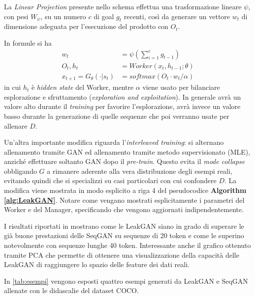 La \emph{Linear Projection} presente nello schema effettua una trasformazione lineare $\psi$, con pesi $W_\psi$, su un numero $c$ di goal $g_t$ recenti, così da generare un vettore $w_t$ di dimensione adeguata per l'esecuzione del prodotto con $O_t$.

\noindent
In formule si ha
\begin{align}
  w_t &= \psi \left( \sum_{i=1}^{c} g_{t-1} \right)
  \\
  O_t, h_t &= Worker(x_t, h_{t-1}; \theta)
  \\
  x_{t+1} = G_\theta(\cdot|s_t) &= softmax ( O_t \cdot w_t / \alpha)
\end{align}
in cui $h_t$ è \emph{hidden state} del Worker, mentre $\alpha$ viene usato per bilanciare esplorazione e sfruttamento (\emph{exploration and exploitation}).
In generale avrà un valore alto durante il \emph{training} per favorire l'esplorazione, avrà invece un valore basso durante la generazione di quelle sequenze che poi verranno usate per allenare $D$.


Un'altra importante modifica riguarda l'\emph{interleaved training}: si alternano allenamento tramite GAN ed allenamento tramite metodo supervisionato (MLE), anziché effettuare soltanto GAN dopo il \emph{pre-train}.
Questo evita il \emph{mode collapse} obbligando $G$ a rimanere aderente alla vera distribuzione degli esempi reali, evitando quindi che si specializzi su casi particolari con cui confondere $D$.
La modifica viene mostrata in modo esplicito a riga 4 del pseudocodice \textbf{Algorithm \ref{alg:LeakGAN}}.
Notare come vengano mostrati esplicitamente i parametri del Worker e del Manager, specificando che vengono aggiornati indipendentemente.

I risultati riportati in \cite{LeakGAN} mostrano come le LeakGAN siano in grado di superare le già buone prestazioni delle SeqGAN su sequenze di 20 token e come le superino notevolmente con sequenze lunghe 40 token.
Interessante anche il grafico ottenuto tramite PCA che permette di ottenere una visualizzazione della capacità delle LeakGAN di raggiungere lo spazio delle feature dei dati reali.

In \autoref{tab:esempi} vengono esposti quattro esempi generati da LeakGAN e SeqGAN allenate con le didascalie del dataset COCO.
\clearpage

